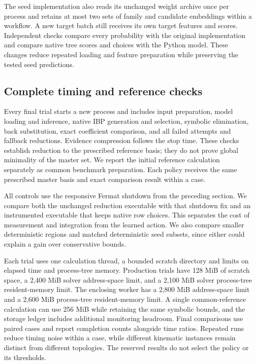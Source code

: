 The seed implementation also reads its unchanged weight archive once
per process and retains at most two sets of family and candidate
embeddings within a workflow. A new target batch still receives its
own target features and scores. Independent checks compare every
probability with the original implementation and compare native tree
scores and choices with the Python model. These changes reduce
repeated loading and feature preparation while preserving the tested
seed predictions.

\subsection{Complete timing and reference checks}
Every final trial starts a new process and includes input preparation,
model loading and inference, native IBP generation and selection,
symbolic elimination, back substitution, exact coefficient comparison,
and all failed attempts and fallback reductions. Evidence compression
follows the stop time. These checks establish reduction to the prescribed reference basis;
they do not prove global minimality of the master set.
We report the initial reference calculation separately as common
benchmark preparation. Each policy receives the same prescribed
master basis and exact comparison result within a case.

All controls use the responsive Fermat shutdown from the preceding
section. We compare both the unchanged reduction executable with that
shutdown fix and an instrumented executable that keeps native row
choices. This separates the cost of measurement and integration from
the learned action. We also compare smaller deterministic regions and
matched deterministic seed subsets, since either could explain a gain
over conservative bounds.

Each trial uses one calculation thread, a bounded scratch directory
and limits on elapsed time and process-tree memory. Production trials
have 128 MiB of scratch space, a 2,400 MiB solver address-space limit, and a 2,100 MiB solver process-tree resident-memory limit. The enclosing worker has a 2,800 MiB address-space limit and a 2,600 MiB process-tree resident-memory limit. A single common-reference calculation
can use 256 MiB while retaining the same symbolic bounds, and the
storage ledger includes additional monitoring headroom. Final comparisons
use paired cases and report completion counts alongside time ratios.
Repeated runs reduce timing noise within a case, while different
kinematic instances remain distinct from different topologies.
The reserved results do not select the policy or its thresholds.
